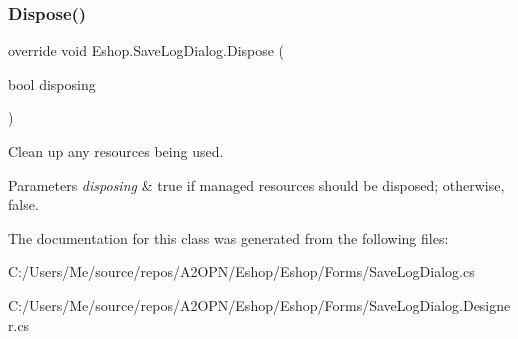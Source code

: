 \subsubsection{\texorpdfstring{Dispose()}{Dispose()}}
{\footnotesize\ttfamily override void Eshop.\+Save\+Log\+Dialog.\+Dispose (\begin{DoxyParamCaption}\item[{bool}]{disposing }\end{DoxyParamCaption})\hspace{0.3cm}{\ttfamily [protected]}}



Clean up any resources being used. 


\begin{DoxyParams}{Parameters}
{\em disposing} & true if managed resources should be disposed; otherwise, false.\\
\hline
\end{DoxyParams}


The documentation for this class was generated from the following files\+:\begin{DoxyCompactItemize}
\item 
C\+:/\+Users/\+Me/source/repos/\+A2\+O\+P\+N/\+Eshop/\+Eshop/\+Forms/Save\+Log\+Dialog.\+cs\item 
C\+:/\+Users/\+Me/source/repos/\+A2\+O\+P\+N/\+Eshop/\+Eshop/\+Forms/Save\+Log\+Dialog.\+Designer.\+cs\end{DoxyCompactItemize}
